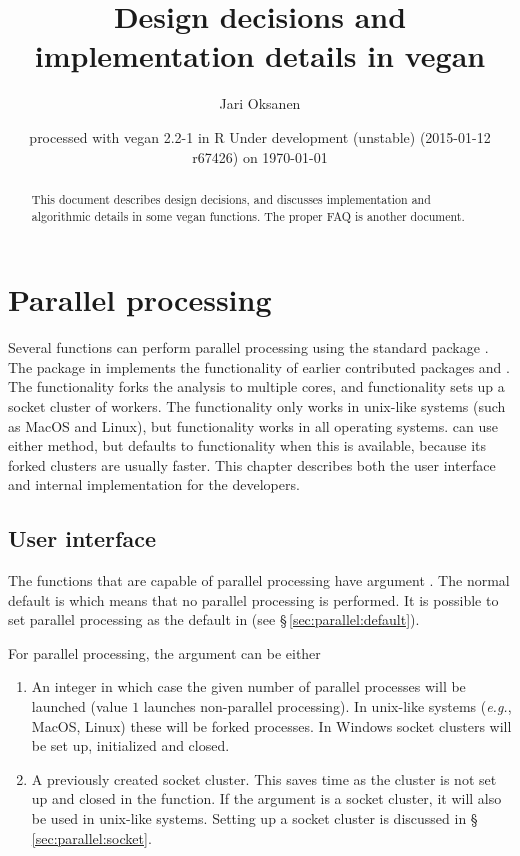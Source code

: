 \documentclass[a4paper,10pt,twocolumn]{article}
\author{Jari Oksanen}
\title{Design decisions and implementation details in vegan}
\date{\footnotesize{
  processed with vegan
2.2-1
in R Under development (unstable) (2015-01-12 r67426) on \today}}
\begin{document}




\maketitle

\begin{abstract}
  This document describes design decisions, and discusses implementation
and algorithmic details in some vegan functions. The proper FAQ is
another document.
\end{abstract}

\tableofcontents

\section{Parallel processing}

Several  functions can perform parallel processing using
the standard \R{} package . 
The  package in \R{} implements
the functionality of earlier contributed packages  and
.  The  functionality forks the analysis to
multiple cores, and  functionality sets up a socket cluster
of workers.  The  functionality only works in unix-like
systems (such as MacOS and Linux), but  functionality works
in all operating systems.   can use either method, but
defaults to  functionality when this is available,
because its forked clusters are usually faster.  This chapter
describes both the user interface and internal implementation for the
developers.

\subsection{User interface}
\label{sec:parallel:ui}

The functions that are capable of parallel processing have argument
.  The normal default is  which
means that no parallel processing is performed.  It is possible to set
parallel processing as the default in  (see
\S\,\ref{sec:parallel:default}). 

For parallel processing, the  argument can be either

\begin{enumerate}
\item An integer in which case the given number of parallel processes
  will be launched (value $1$ launches non-parallel processing). In
  unix-like systems (\emph{e.g.}, MacOS, Linux) these will be forked
   processes. In Windows socket clusters will be set up,
  initialized and closed.
\item A previously created socket cluster. This saves time as the
  cluster is not set up and closed in the function.  If the argument is a
  socket cluster, it will also be used in unix-like systems. Setting
  up a socket cluster is discussed in \S\,\ref{sec:parallel:socket}.
\end{enumerate}
\end{document}
